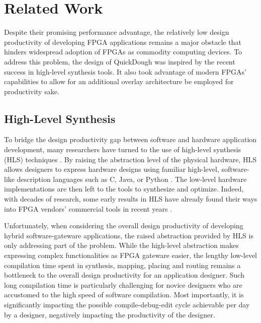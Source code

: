 \section{Related Work}\label{sec:relatedwork}
Despite their promising performance advantage, the relatively low design productivity of developing FPGA applications remains a major obstacle that hinders widespread adoption of FPGAs as commodity computing devices.
To address this problem, the design of QuickDough was inspired by the recent success in high-level synthesis tools.  It also took advantage of modern FPGAs' capabilities to allow for an additional overlay architecture be employed for productivity sake.

\subsection{High-Level Synthesis}
To bridge the design productivity gap between software and hardware application development, many researchers have turned to the use of high-level synthesis (HLS) techniques \cite{cong2011high}.
By raising the abstraction level of the physical hardware, HLS allows designers to express hardware designs using familiar high-level, software-like description languages such as C, Java, or Python \cite{cardoso2010compiling,Canis:2011:LHS:1950413.1950423}.
The low-level hardware implementations are then left to the tools to synthesize and optimize.
Indeed, with decades of research, some early results in HLS have already found their ways into FPGA vendors' commercial tools in recent years \cite{chen2005xpilot, zhang2008autopilot, VivadoHLS}.

Unfortunately, when considering the overall design productivity of developing hybrid software-gateware applications, the raised abstraction provided by HLS is only addressing part of the problem.
While the high-level abstraction makes expressing complex functionalities as FPGA gateware easier, the lengthy low-level compilation time spent in synthesis, mapping, placing and routing remains a bottleneck to the overall design productivity for an application designer.
Such long compilation time is particularly challenging for novice designers who are accustomed to the high speed of software compilation.
Most importantly, it is significantly impacting the possible compile-debug-edit cycle achievable per day by a designer, negatively impacting the productivity of the designer.

